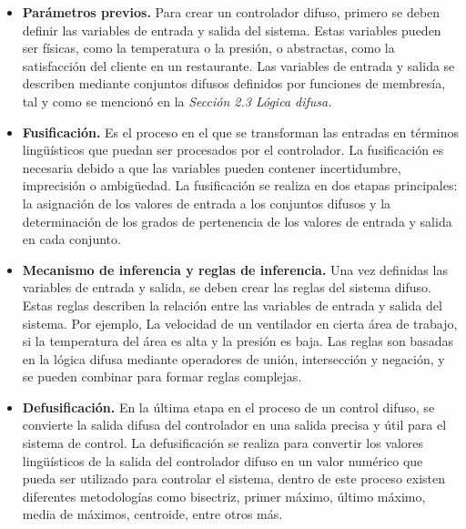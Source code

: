 \begin{itemize}
    \item \textbf{Parámetros previos.} Para crear un controlador difuso, primero se deben definir las variables de entrada y salida del sistema. Estas variables pueden ser físicas, como la temperatura o la presión, o abstractas, como la satisfacción del cliente en un restaurante. Las variables de entrada y salida se describen mediante conjuntos difusos definidos por funciones de membresía, tal y como se mencionó en la \textit{Sección 2.3 Lógica difusa.}

    \item \textbf{Fusificación.} Es el proceso en el que se transforman las entradas en términos lingüísticos que puedan ser procesados por el controlador. La fusificación es necesaria debido a que las variables pueden contener incertidumbre, imprecisión o ambigüedad. La fusificación se realiza en dos etapas principales: la asignación de los valores de entrada a los conjuntos difusos y la determinación de los grados de pertenencia de los valores de entrada y salida en cada conjunto.
    \item \textbf{Mecanismo de inferencia y reglas de inferencia.} Una vez definidas las variables de entrada y salida, se deben crear las reglas del sistema difuso. Estas reglas describen la relación entre las variables de entrada y salida del sistema. Por ejemplo, La velocidad de un ventilador en cierta área de trabajo, si la temperatura del área es alta y la presión es baja. Las reglas son basadas en la lógica difusa mediante operadores de unión, intersección y negación, y se pueden combinar para formar reglas complejas.

    \item \textbf{Defusificación.} En la última etapa en el proceso de un control difuso, se convierte la salida difusa del controlador en una salida precisa y útil para el sistema de control. La defusificación se realiza para convertir los valores lingüísticos de la salida del controlador difuso en un valor numérico que pueda ser utilizado para controlar el sistema, dentro de este proceso existen diferentes metodologías como bisectriz, primer máximo, último máximo, media de máximos, centroide, entre otros más.



\end{itemize}






